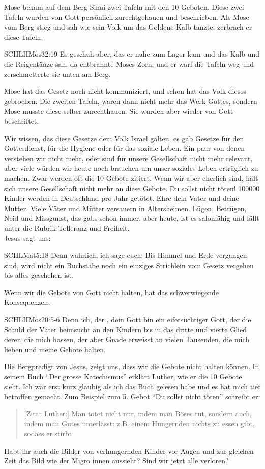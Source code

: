     Mose bekam auf dem Berg Sinai zwei Tafeln mit den 10 Geboten. Diese zwei Tafeln wurden von Gott persönlich zurechtgehauen und beschrieben. Als Mose vom Berg stieg und sah wie sein Volk um das Goldene Kalb tanzte, zerbrach er diese Tafeln.
    \begin{bibelquote}{SCHL}{IIMos}{32:19}
        Es geschah aber, das er nahe zum Lager kam und das Kalb und die Reigentänze sah, da entbrannte Moses Zorn, und er warf die Tafeln weg und zerschmetterte sie unten am Berg.
    \end{bibelquote}
    Mose hat das Gesetz noch nicht kommuniziert, und schon hat das Volk dieses gebrochen. Die zweiten Tafeln, waren dann nicht mehr das Werk Gottes, sondern Mose musste diese selber zurechthauen. Sie wurden aber wieder von Gott beschriftet.
    
    Wir wissen, das diese Gesetze dem Volk Israel galten, es gab Gesetze für den Gottesdienst, für die Hygiene oder für das soziale Leben. Ein paar von denen verstehen wir nicht mehr, oder sind für unsere Gesellschaft nicht mehr relevant, aber viele würden wir heute noch brauchen um unser soziales Leben erträglich zu machen. Zwar werden oft die 10 Gebote zitiert. Wenn wir aber eherlich sind, hält sich unsere Gesellschaft nicht mehr an diese Gebote. Du sollst nicht töten! 100000 Kinder werden in Deutschland pro Jahr getötet. Ehre dein Vater und deine Mutter. Viele Väter und Mütter versauern in Altersheimen. Lügen, Betrügen, Neid und Missgunst, das gab\singlespacing s schon immer, aber heute, ist es salonfähig und fällt unter die Rubrik Tolleranz und Freiheit.\\
    Jesus sagt uns:
     \begin{bibelquote}{SCHL}{Mat}{5:18}
        Denn wahrlich, ich sage euch: Bis Himmel und Erde vergangen sind, wird nicht ein Buchstabe noch ein einziges Strichlein vom Gesetz vergehen bis alles geschehen ist.
    \end{bibelquote}
    Wenn wir die Gebote von Gott nicht halten, hat das schwerwiegende Konsequenzen.
    \begin{bibelquote}{SCHL}{IIMos}{20:5-6}
        Denn ich, der \herr, dein Gott bin ein eifersüchtiger Gott, der die Schuld der Väter heimsucht an den Kindern bis in das dritte und vierte Glied derer, die mich hassen, der aber Gnade erweisst an vielen Tausenden, die mich lieben und meine Gebote halten.
    \end{bibelquote}
    Die Bergpredigt von Jesus, zeigt uns, dass wir die Gebote nicht halten können.
    In seinem Buch \enquote{Der grosse Katechismus} erklärt Luther, wie er die 10 Gebote sieht. Ich war erst kurz gläubig als ich das Buch gelesen habe und es hat mich tief betroffen gemacht. Zum Beispiel zum 5. Gebot \enquote{Du sollst nicht töten} schreibt er:
    \begin{quotation}[Zitat Luther:]
        Man tötet nicht nur, indem man Böses tut, sondern auch, indem man Gutes unterlässt: z.B. einem Hungernden nichts zu essen gibt, sodass er stirbt
    \end{quotation}
    Habt ihr auch die Bilder von verhungernden Kinder vor Augen und zur gleichen Zeit das Bild wie der Migro innen aussieht? Sind wir jetzt alle verloren?

